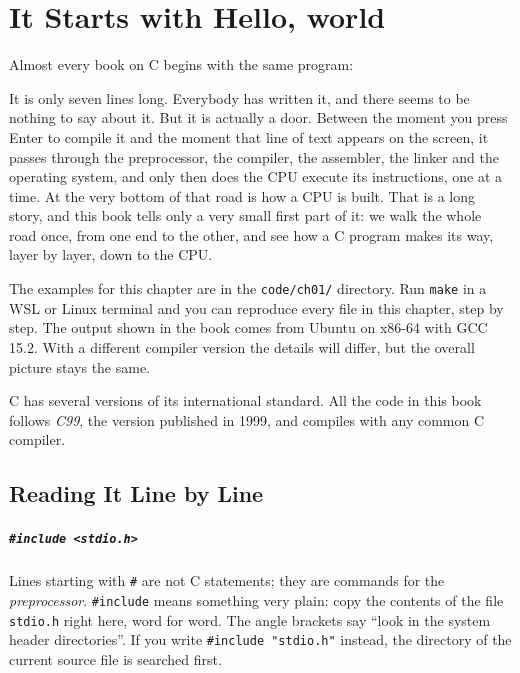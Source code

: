 \chapter{It Starts with Hello, world}
\label{chap:hello}

Almost every book on C begins with the same program:

It is only seven lines long. Everybody has written it, and there seems to be nothing to say about it. But it is actually a door. Between the moment you press Enter to compile it and the moment that line of text appears on the screen, it passes through the preprocessor, the compiler, the assembler, the linker and the operating system, and only then does the CPU execute its instructions, one at a time. At the very bottom of that road is how a CPU is built. That is a long story, and this book tells only a very small first part of it: we walk the whole road once, from one end to the other, and see how a C program makes its way, layer by layer, down to the CPU.

The examples for this chapter are in the \texttt{code/ch01/} directory. Run \texttt{make} in a WSL or Linux terminal and you can reproduce every file in this chapter, step by step. The output shown in the book comes from Ubuntu on x86-64 with GCC 15.2. With a different compiler version the details will differ, but the overall picture stays the same.

C has several versions of its international standard. All the code in this book follows \emph{C99}, the version published in 1999, and compiles with any common C compiler.

\section{Reading It Line by Line}

\paragraph{\texttt{\#include <stdio.h>}}
Lines starting with \texttt{\#} are not C statements; they are commands for the \emph{preprocessor}. \texttt{\#include} means something very plain: copy the contents of the file \texttt{stdio.h} right here, word for word. The angle brackets say ``look in the system header directories''. If you write \texttt{\#include "stdio.h"} instead, the directory of the current source file is searched first.

